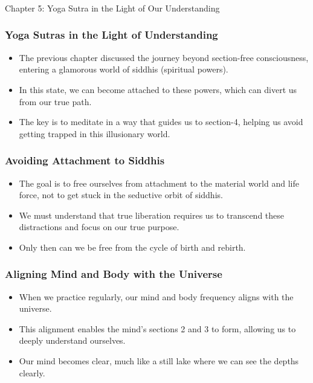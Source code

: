 \begin{frame}[fragile]\frametitle{}
\begin{center}
{\Large Chapter 5: Yoga Sutra in the Light of Our Understanding }
\end{center}
\end{frame}

\begin{frame}[fragile]\frametitle{Yoga Sutras in the Light of Understanding}
    \begin{itemize}
        \item The previous chapter discussed the journey beyond section-free consciousness, entering a glamorous world of siddhis (spiritual powers).
        \item In this state, we can become attached to these powers, which can divert us from our true path.
        \item The key is to meditate in a way that guides us to section-4, helping us avoid getting trapped in this illusionary world.
    \end{itemize}
\end{frame}

\begin{frame}[fragile]\frametitle{Avoiding Attachment to Siddhis}
    \begin{itemize}
        \item The goal is to free ourselves from attachment to the material world and life force, not to get stuck in the seductive orbit of siddhis.
        \item We must understand that true liberation requires us to transcend these distractions and focus on our true purpose.
        \item Only then can we be free from the cycle of birth and rebirth.
    \end{itemize}
\end{frame}

\begin{frame}[fragile]\frametitle{Aligning Mind and Body with the Universe}
    \begin{itemize}
        \item When we practice regularly, our mind and body frequency aligns with the universe.
        \item This alignment enables the mind's sections 2 and 3 to form, allowing us to deeply understand ourselves.
        \item Our mind becomes clear, much like a still lake where we can see the depths clearly.
    \end{itemize}
\end{frame}

